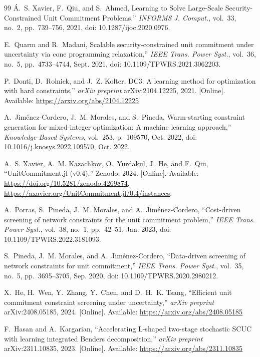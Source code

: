 \documentclass{ieeeaccess}
\begin{document}
\begin{thebibliography}{99}
 Á.~S. Xavier, F.~Qiu, and S.~Ahmed, Learning to Solve Large-Scale Security-Constrained Unit Commitment Problems,'' \emph{INFORMS J. Comput.}, vol.~33, no.~2, pp.~739--756, 2021, doi: 10.1287/ijoc.2020.0976. 

E.~Quarm and R.~Madani, Scalable security-constrained unit commitment under uncertainty via cone programming relaxation,'' \emph{IEEE Trans. Power Syst.}, vol.~36, no.~5, pp.~4733--4744, Sept. 2021, doi: 10.1109/TPWRS.2021.3062203. 

 P.~Donti, D.~Rolnick, and J.~Z. Kolter, DC3: A learning method for optimization with hard constraints,'' \emph{arXiv preprint} arXiv:2104.12225, 2021. [Online]. Available: \url{https://arxiv.org/abs/2104.12225}

A.~Jiménez-Cordero, J.~M. Morales, and S.~Pineda, Warm-starting constraint generation for mixed-integer optimization: A machine learning approach,'' \emph{Knowledge-Based Systems}, vol.~253, p.~109570, Oct. 2022, doi: 10.1016/j.knosys.2022.109570, Oct. 2022.

A.~S. Xavier, A.~M. Kazachkov, O.~Yurdakul, J.~He, and F.~Qiu, ``UnitCommitment.jl (v0.4),'' Zenodo, 2024. [Online]. Available: \url{https://doi.org/10.5281/zenodo.4269874}, \url{https://axavier.org/UnitCommitment.jl/0.4/instances}.


A.~Porras, S.~Pineda, J.~M. Morales, and A.~Jim\'{e}nez-Cordero,
``Cost-driven screening of network constraints for the unit commitment
problem,'' \emph{IEEE Trans. Power Syst.}, vol.~38, no.~1, pp.~42--51,
Jan. 2023, doi: 10.1109/TPWRS.2022.3181093.

S.~Pineda, J.~M. Morales, and A.~Jim\'{e}nez-Cordero,
``Data-driven screening of network constraints for unit commitment,'' \emph{IEEE Trans.
Power Syst.}, vol.~35, no.~5, pp.~3695--3705, Sep. 2020,
doi: 10.1109/TPWRS.2020.2980212.

X.~He, H.~Wen, Y.~Zhang, Y.~Chen, and D.~H.~K. Tsang,
``Efficient unit commitment constraint screening under uncertainty,'' \emph{arXiv preprint}
arXiv:2408.05185, 2024. [Online]. Available:
\url{https://arxiv.org/abs/2408.05185}


F.~Hasan and A.~Kargarian,
``Accelerating L-shaped two-stage stochastic {SCUC} with learning integrated
Benders decomposition,'' \emph{arXiv preprint} arXiv:2311.10835, 2023.
[Online]. Available: \url{https://arxiv.org/abs/2311.10835}


\end{thebibliography}
\end{document}

